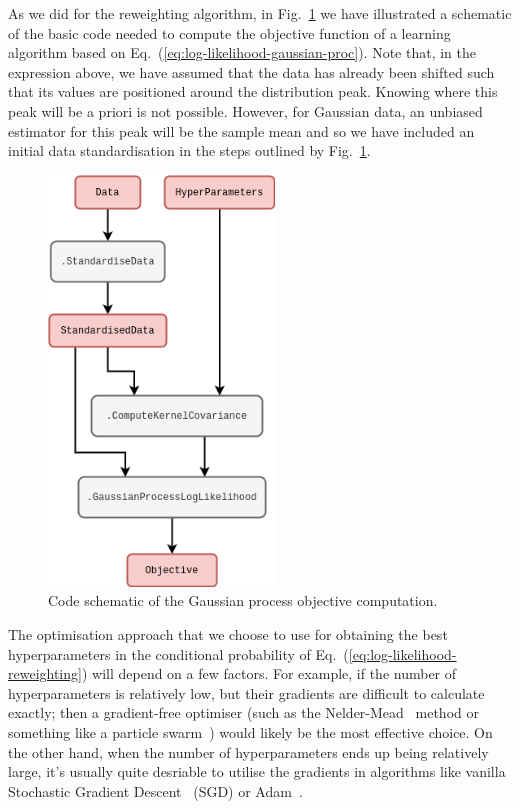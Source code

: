 As we did for the reweighting algorithm, in Fig.~\ref{fig:gaussian-process-code} we have illustrated a schematic of the basic code needed to compute the objective function of a learning algorithm based on Eq.~(\ref{eq:log-likelihood-gaussian-proc}). Note that, in the expression above, we have assumed that the data has already been shifted such that its values are positioned around the distribution peak. Knowing where this peak will be a priori is not possible. However, for Gaussian data, an unbiased estimator for this peak will be the sample mean and so we have included an initial data standardisation in the steps outlined by Fig.~\ref{fig:gaussian-process-code}.

\begin{figure}[h]
\centering
\includegraphics[width=6cm]{images/chapter-2-gaussian-process-code.drawio.png}
\caption{Code schematic of the Gaussian process objective computation.}
\label{fig:gaussian-process-code}
\end{figure}

The optimisation approach that we choose to use for obtaining the best hyperparameters in the conditional probability of Eq.~(\ref{eq:log-likelihood-reweighting}) will depend on a few factors. For example, if the number of hyperparameters is relatively low, but their gradients are difficult to calculate exactly; then a gradient-free optimiser (such as the Nelder-Mead~\cite{nelder1965simplex} method or something like a particle swarm~\cite{kennedy1995particle, shi1998modified}) would likely be the most effective choice. On the other hand, when the number of hyperparameters ends up being relatively large, it's usually quite desriable to utilise the gradients in algorithms like vanilla Stochastic Gradient Descent~\cite{robbins1951stochastic} (SGD) or Adam~\cite{kingma2014adam}.

